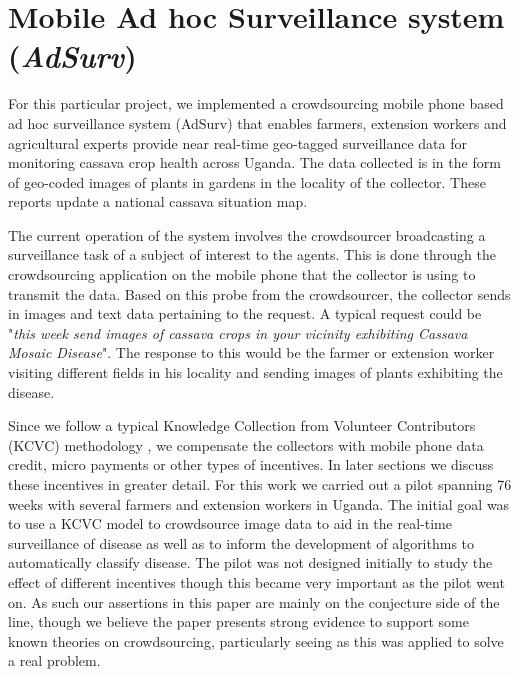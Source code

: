 \documentclass[letterpaper]{article} %
\begin{document}
\section{Mobile Ad hoc Surveillance system (\emph{AdSurv}) }

For this particular project, we implemented a crowdsourcing mobile phone based ad hoc surveillance system (AdSurv) that enables farmers, extension workers and agricultural experts provide near real-time geo-tagged surveillance data for monitoring cassava crop health across Uganda. The data collected is in the form of geo-coded images of plants in gardens in the locality of the collector. These reports update a national cassava situation map.

The current operation of the system involves the crowdsourcer broadcasting a surveillance task of a subject of interest to the agents. This is done through the crowdsourcing application on the mobile phone that the collector is using to transmit the data. Based on this probe from the crowdsourcer, the collector sends in images and text data pertaining to the request. A typical request could be "\emph{this week send images of cassava crops in your vicinity exhibiting Cassava Mosaic Disease}". The response to this would be the farmer or extension worker visiting different fields in his locality and sending images of plants exhibiting the disease.

Since we follow a typical Knowledge Collection from Volunteer Contributors (KCVC) methodology \cite{chklovski2005towards}, we compensate the collectors with mobile phone data credit, micro payments or other types of incentives. In later sections we discuss these incentives in greater detail. For this work we carried out a pilot spanning 76 weeks with several farmers and extension workers in Uganda. The initial goal was to use a KCVC model to crowdsource image data to aid in the real-time surveillance of disease  as well as to inform the development of algorithms to automatically classify disease. The pilot was not designed initially to study the effect of different incentives though this became very important as the pilot went on. As such our assertions in this paper are mainly on the conjecture side of the line, though we believe the paper presents strong evidence to support some known theories on crowdsourcing, particularly seeing as this was applied to solve a real problem.
\end{document}
